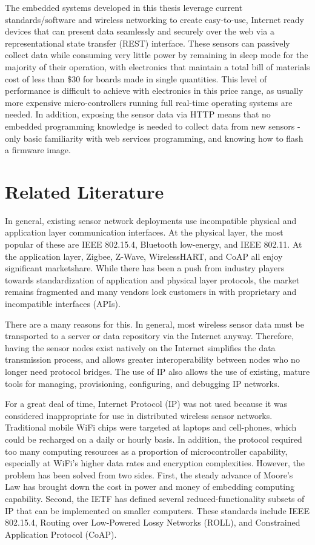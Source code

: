 The embedded systems developed in this thesis leverage current standards/software and wireless networking to create easy-to-use, Internet ready devices that can present data seamlessly and securely over the web via a representational state transfer (REST)\cite{fielding2002principled} interface. These sensors can passively collect data while consuming very little power by remaining in sleep mode for the majority of their operation, with electronics that maintain a total bill of materials  cost of less than \$30 for boards made in single quantities. This level of performance is difficult to achieve with electronics in this price range, as usually more expensive micro-controllers running full real-time operating systems are needed. In addition, exposing the sensor data via HTTP means that no embedded programming knowledge is needed to collect data from new sensors - only basic familiarity with web services programming, and knowing how to flash a firmware image.

\section{Related Literature}

In general, existing sensor network deployments use incompatible physical and application layer communication interfaces. At the physical layer, the most popular of these are IEEE 802.15.4, Bluetooth low-energy, and IEEE 802.11. At the application layer, Zigbee, Z-Wave, WirelessHART, and CoAP all enjoy significant marketshare. While there has been a push from industry players towards standardization of application and physical layer protocols, the market remains fragmented and many vendors lock customers in with proprietary and incompatible interfaces (APIs).

There are a many reasons for this. In general, most wireless sensor data must be transported to a server or data repository via the Internet anyway. Therefore, having the sensor nodes exist natively on the Internet simplifies the data transmission process, and allows greater interoperability between nodes who no longer need protocol bridges. The use of IP also allows the use of existing, mature tools for managing, provisioning, configuring, and debugging IP networks.  

For a great deal of time, Internet Protocol (IP) was not used because it was considered inappropriate for use in distributed wireless sensor networks. Traditional mobile WiFi chips were targeted at laptops and cell-phones, which could be recharged on a daily or hourly basis. In addition, the protocol required too many computing resources as a proportion of microcontroller capability, especially at WiFi's higher data rates and encryption complexities. However, the problem has been solved from two sides. First, the steady advance of Moore's Law has brought down the cost in power and money of embedding computing capability. Second, the IETF has defined several reduced-functionality subsets of IP that can be implemented on smaller computers. These standards include IEEE 802.15.4, Routing over Low-Powered Lossy Networks (ROLL), and Constrained Application Protocol (CoAP). 

